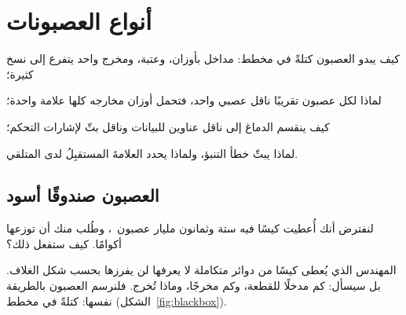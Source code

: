 \chapter{أنواع العصبونات}
\label{sec:neurontypes}
\begin{chaptergoals}
\item كيف يبدو العصبون كتلةً في مخطط: مداخل بأوزان، وعتبة، ومخرج واحد يتفرع إلى نسخ كثيرة؛
\item لماذا لكل عصبون تقريبًا ناقل عصبي واحد، فتحمل أوزان مخارجه كلها علامة واحدة؛
\item كيف ينقسم الدماغ إلى ناقل عناوين للبيانات وناقل بثّ لإشارات التحكم؛
\item لماذا يبثّ  خطأ التنبؤ، ولماذا يحدد العلامةَ المستقبِلُ لدى المتلقي.
\end{chaptergoals}

\section{العصبون صندوقًا أسود}

لنفترض أنك أُعطيت كيسًا فيه ستة وثمانون مليار عصبون~\cite{Azevedo2009}، وطُلب منك أن توزعها أكوامًا. كيف ستفعل ذلك؟

المهندس الذي يُعطى كيسًا من دوائر متكاملة لا يعرفها لن يفرزها بحسب شكل الغلاف. بل سيسأل: كم مدخلًا للقطعة، وكم مخرجًا، وماذا تُخرج. فلنرسم العصبون بالطريقة نفسها: كتلةً في مخطط (الشكل~\ref{fig:blackbox}).

